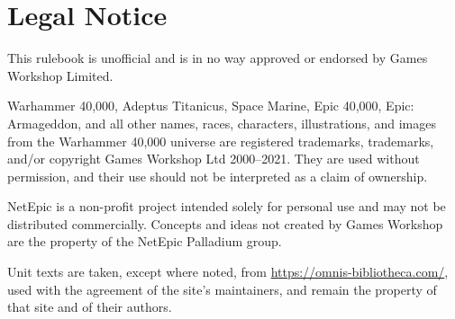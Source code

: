 \section{Legal Notice}

This rulebook is unofficial and is in no way approved or endorsed by Games Workshop Limited.

Warhammer 40,000, Adeptus Titanicus, Space Marine, Epic 40,000, Epic: Armageddon, and all other names, races, characters, illustrations, and images from the Warhammer 40,000 universe are registered trademarks, trademarks, and/or copyright Games Workshop Ltd 2000--2021. They are used without permission, and their use should not be interpreted as a claim of ownership.

NetEpic is a non-profit project intended solely for personal use and may not be distributed commercially. Concepts and ideas not created by Games Workshop are the property of the NetEpic Palladium group.

Unit texts are taken, except where noted, from \url{https://omnis-bibliotheca.com/}, used with the agreement of the site's maintainers, and remain the property of that site and of their authors.
